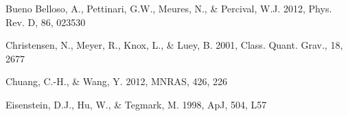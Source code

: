 \documentclass[iop]{emulateapj}
\begin{document}
\begin{thebibliography}{}



Bueno Belloso, A., Pettinari, G.W., Meures, N., \& Percival, W.J. 2012, Phys. Rev. D, 86, 023530




Christensen, N., Meyer, R., Knox, L., \& Luey, B. 2001, Class. Quant. Grav., 18, 2677


Chuang, C.-H., \& Wang, Y. 2012, MNRAS, 426, 226  






Eisenstein, D.J., Hu, W., \& Tegmark, M. 1998, ApJ, 504, L57








\end{thebibliography}
\end{document}
